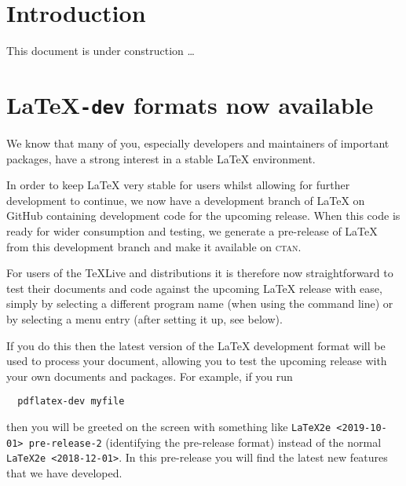 \documentclass{ltnews}
\providecommand\MiKTeX{\hologo{MiKTeX}}
\providecommand\CTAN{\textsc{ctan}}
\providecommand\TL{\TeX{}Live}
\begin{document}

\maketitle
\tableofcontents

\setlength{}

\newpage

\section{Introduction}

This document is under construction \ldots


\section{\LaTeX\texttt{-dev} formats now available}


We know that many of you, especially developers and maintainers of
important packages, have a strong interest in a stable \LaTeX{}
environment.

In order to keep \LaTeX{} very stable for users whilst allowing for
further development to continue, we now have a development branch of
\LaTeX{} on GitHub containing development code for the upcoming
release. When this code is ready for wider consumption and testing, we
generate a pre-release of \LaTeX{} from this development branch and make
it available on \CTAN.

For users of the \TL{} and \MiKTeX{} distributions it is therefore now
straightforward to test their documents and code against the upcoming
\LaTeX{} release with ease, simply by selecting a different program name
(when using the command line) or by selecting a menu entry (after
setting it up, see below).

If you do this then the latest version of the \LaTeX{} development format
will be used to process your document, allowing you to test the
upcoming release with your own documents and packages. For example, if
you run
\begin{verbatim}
  pdflatex-dev myfile
\end{verbatim}
then you will be greeted on the screen with something like \texttt{LaTeX2e
  <2019-10-01> pre-release-2} (identifying the pre-release format)
instead of the normal \texttt{LaTeX2e <2018-12-01>}. In this
pre-release you will find the latest new features that we have
developed. 
\end{document}
